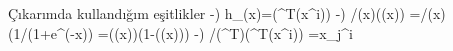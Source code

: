 \section{} Çıkarımda kullandığım eşitlikler
\newline
{}-)
 h_\theta(x)=\sigma(\theta^T(x^i))
\newline
{}-) \partial/\partial(x)\sigma((x))
=\partial/\partial(x)(1/(1+e^(-x))
=\sigma((x))(1-\sigma((x)))
\newline
{}-)
 \partial/\partial(\theta^T)(\theta^T(x^i))
=x_j^i


